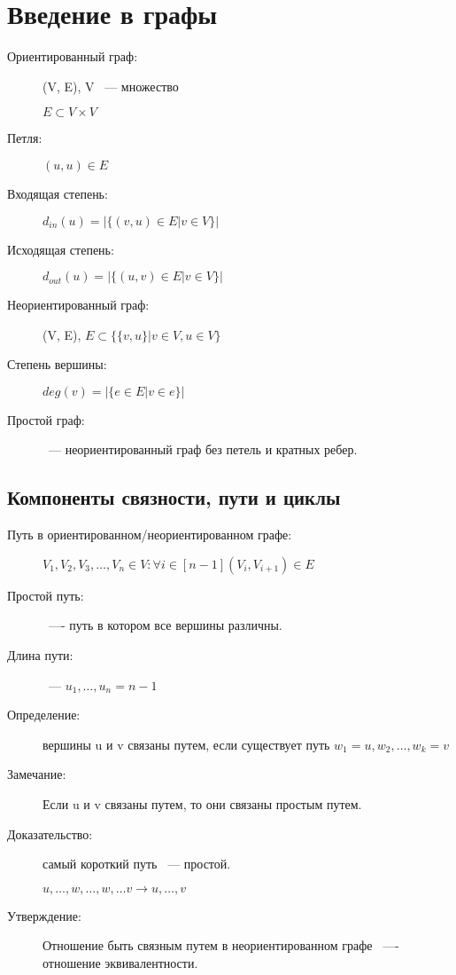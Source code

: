 \documentclass[12pt]{article}
\begin{document}
\section{Введение в графы}

\begin{description}
\item[Ориентированный граф:] (V, E), V ~--- множество

$E \subset V \times V$
\item[Петля:] $(u, u) \in E$

\item[Входящая степень:] $d_{in}(u) = |\{(v, u) \in E | v \in V\}|$

\item[Исходящая степень:] $d_{out}(u) = |\{(u, v) \in E | v \in V\}|$ 


\item[Неориентированный граф:] (V, E), 
$E \subset \{\{v, u\}|v\in V, u \in V\}$

\item[Степень вершины:] $deg(v) = |\{e \in E | v \in e\}|$

\item[Простой граф:] ~--- неориентированный граф без петель и кратных ребер. 
\end{description}

\subsection{Компоненты связности, пути и циклы}

\begin{description}
\item[Путь в ориентированном/неориентированном графе:] 

$V_1, V_2, V_3, \ldots, V_n \in V: \forall i \in [n - 1]  (V_i, V_{i + 1}) \in E$

\item[Простой путь:] ~---- путь в котором все вершины различны. 

\item[Длина пути:] ~--- $u_1, \ldots, u_n = n - 1$
\item[Определение:] вершины u и v связаны путем, если существует путь $w_1 = u, w_2, \ldots, w_k = v$

\item[Замечание:] Если u и v связаны путем, то они связаны простым путем. 

\item[Доказательство:] самый короткий путь ~--- простой. 

$u, \ldots, w, \ldots, w, \ldots v \to u, \ldots, v$

\item[Утверждение:] Отношение быть связным путем в неориентированном графе ~---- отношение эквивалентности.
\end{description}
\end{document}
